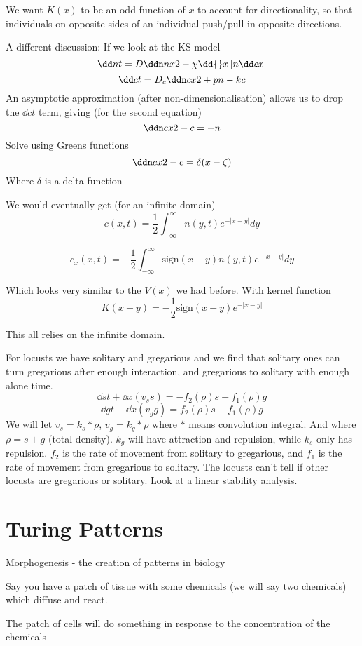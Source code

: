 \documentclass{X:/Documents/Coding/Latex/myassignment}
\begin{document}
We want $K(x)$ to be an odd function of $x$ to account for directionality, so that individuals on opposite sides of an individual push/pull in opposite directions.






A different discussion:
If we look at the KS model
\[\dd nt =  D \ddn nx2 - \chi \dd{}x \left[n \dd cx\right]\]
\[\dd ct = D_c \ddn cx2 + pn - kc\]
An asymptotic approximation (after non-dimensionalisation) allows us to drop the $\dd ct$ term, giving (for the second equation)
\[ \ddn cx2  -c = -n\]
Solve using Greens functions
\[\ddn cx2 - c = \delta(x- \zeta)\]
Where $\delta$ is a delta function

We would eventually get (for an infinite domain)
\[c(x,t) = \frac12 \int_{-\infty}^{\infty} n(y,t) e^{- |x-y|} dy\]

\[c_x(x,t) = -\frac12 \int_{-\infty}^{\infty}\textrm{sign}(x-y)  n(y,t) e^{- |x-y|} dy\]

Which looks very similar to the $V(x)$ we had before.
With kernel function
\[K(x-y) = -\frac12 \textrm{sign}(x-y) e^{-|x-y|} \]


This all relies on the infinite domain.



For locusts we have solitary and gregarious and we find that solitary ones can turn gregarious after enough interaction, and gregarious to solitary with enough alone time.
\[\dd st + \dd{}x (v_s s) = - f_2(\rho) s + f_1(\rho)g\]
\[\dd gt + \dd{}x (v_g g) = f_2(\rho) s - f_1(\rho) g\]
We will let $v_s = k_s *\rho$, $v_g = k_g * \rho$ where $*$ means convolution integral. And where $\rho = s+g$ (total density).
$k_g$ will have attraction and repulsion, while $k_s$ only has repulsion.
$f_2$ is the rate of movement from solitary to gregarious, and $f_1$ is the rate of movement from gregarious to solitary.
The locusts can't tell if other locusts are gregarious or solitary.
Look at a linear stability analysis.



\section{Turing Patterns}
Morphogenesis - the creation of patterns in biology

Say you have a patch of tissue with some chemicals (we will say two chemicals) which diffuse and react.

The patch of cells will do something in response to the concentration of the chemicals
\end{document}
